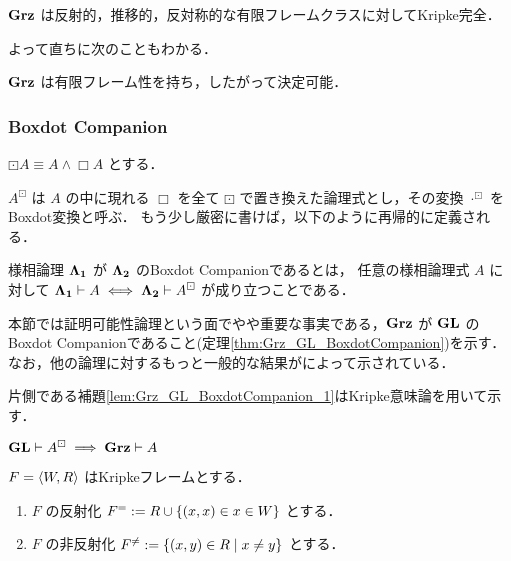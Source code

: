 \documentclass{jlreq}
\begin{document}
\begin{theorem}
	$\mathbf{Grz}$ は反射的，推移的，反対称的な有限フレームクラスに対してKripke完全．
\end{theorem}

よって直ちに次のこともわかる．

\begin{corollary}
	$\mathbf{Grz}$ は有限フレーム性を持ち，したがって決定可能．
\end{corollary}

\subsubsection{Boxdot Companion}

\begin{definition}
	$\boxdot A \equiv A \land \Box A$ とする．
\end{definition}

\begin{definition}[Boxdot変換]
	$A^\boxdot$ は $A$ の中に現れる $\Box$ を全て $\boxdot$ で置き換えた論理式とし，その変換 $\cdot^\boxdot$ をBoxdot変換と呼ぶ．
	もう少し厳密に書けば，以下のように再帰的に定義される．
\end{definition}

\begin{definition}
	様相論理 $\mathbf{\Lambda_1}$ が $\mathbf{\Lambda_2}$ のBoxdot Companionであるとは，
	任意の様相論理式 $A$ に対して $\mathbf{\Lambda_1} \vdash A \iff \mathbf{\Lambda_2} \vdash A^\boxdot$ が成り立つことである．
\end{definition}

本節では証明可能性論理という面でやや重要な事実である，$\mathbf{Grz}$ が $\mathbf{GL}$ のBoxdot Companionであること(定理\ref{thm:Grz_GL_BoxdotCompanion})を示す．
なお，他の論理に対するもっと一般的な結果が\cite*{jerabek_cluster_2016}によって示されている．

片側である補題\ref{lem:Grz_GL_BoxdotCompanion_1}はKripke意味論を用いて示す．

\begin{lemma}\label{lem:Grz_GL_BoxdotCompanion_1}
	$\mathbf{GL} \vdash A^\boxdot \implies \mathbf{Grz} \vdash A$
\end{lemma}

\begin{definition}
	$F = \langle W, R \rangle$ はKripkeフレームとする．
	\begin{enumerate}
		\item $F$ の反射化 $F^{=} := R \cup \{ (x, x) \in x \in W\}$ とする．
		\item $F$ の非反射化 $F^{\neq} := \{(x,y) \in R \mid x \neq y \}$ とする．
	\end{enumerate}
\end{definition}
\end{document}
